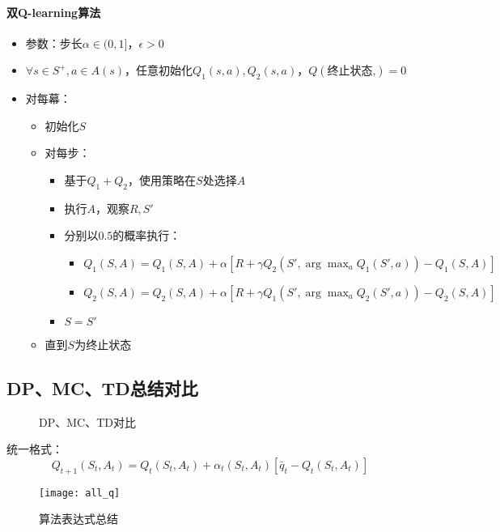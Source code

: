 \documentclass[
12pt, %
a4paper, 
oneside, %
headinclude,footinclude, %
]{scrartcl}
\begin{document}
\paragraph{双Q-learning算法}
\begin{itemize}
\item 参数：步长$ \alpha \in (0,1] $，$ \epsilon > 0 $
\item $ \forall s \in S^+, a \in A(s) $，任意初始化$ Q_1(s,a),Q_2(s,a) $，$ Q(\text{终止状态,}) = 0 $
\item 对每幕：
\begin{itemize}
\item 初始化$ S $
\item 对每步：
\begin{itemize}
\item 基于$ Q_1 + Q_2 $，使用策略在$ S $处选择$ A $
\item 执行$ A $，观察$ R,S' $
\item 分别以$ 0.5 $的概率执行：
\begin{itemize}
\item $ Q_1(S, A) = Q_1(S, A) + \alpha [R + \gamma Q_2(S', \arg \max_a Q_1(S',a)) - Q_1(S, A)] $
\item $ Q_2(S, A) = Q_2(S, A) + \alpha [R + \gamma Q_1(S', \arg \max_a Q_2(S',a)) - Q_2(S, A)] $
\end{itemize}
\item $ S = S' $
\end{itemize}
\item 直到$ S $为终止状态
\end{itemize}
\end{itemize}
\subsection{DP、MC、TD总结对比}
\begin{figure}[H]
\centering
{} \quad
{} \quad
{}
\caption[DP、MC、TD对比]{DP、MC、TD对比}
\end{figure}
统一格式：
$$ Q_{t + 1}(S_t, A_t) = Q_t(S_t, A_t) + \alpha_t(S_t, A_t)[\bar{q}_t - Q_t(S_t, A_t)] $$

\begin{figure}[H]
\centering
\texttt{[image: all\_q]}
\caption[算法表达式总结]{算法表达式总结}
\end{figure}
\end{document}
